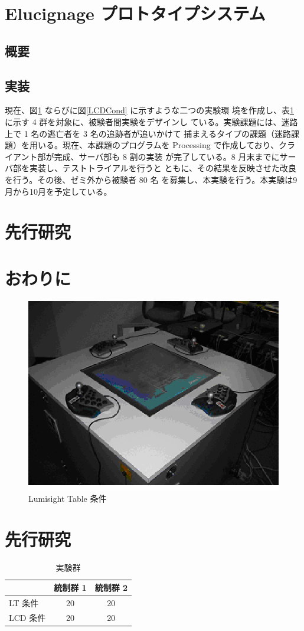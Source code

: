 \documentclass{matsushita-zemi}
\begin{document}
\section{Elucignage プロトタイプシステム}
\subsection{概要}

\subsection{実装}
現在、図\ref{LTCond} ならびに図\ref{LCDCond} に示すような二つの実験環
境を作成し、表\ref{exp} に示す 4 群を対象に、被験者間実験をデザインし
ている。実験課題には、迷路上で 1 名の逃亡者を 3 名の追跡者が追いかけて
捕まえるタイプの課題（迷路課題）を用いる。現在、本課題のプログラムを 
Processing で作成しており、クライアント部が完成、サーバ部も 8 割の実装
が完了している。8 月末までにサーバ部を実装し、テストトライアルを行うと
ともに、その結果を反映させた改良を行う。その後、ゼミ外から被験者 80 名
を募集し、本実験を行う。本実験は9月から10月を予定している。

\section{先行研究}
\label{relatedworks} 

\section{おわりに}

\begin{figure}[b]
 \centering
 \includegraphics[width=0.4\columnwidth]{LTCond.eps}
 \caption{Lumisight Table 条件}
 \label{LTCond}
\end{figure}

\section{先行研究}
\label{relatedworks} 

\begin{table}[p]
\caption{実験群}
\label{exp}
\begin{center}
\begin{tabular}{lcc}
\hline\hline
         & 統制群 1 & 統制群 2\\
\hline
LT 条件  & 20       &   20    \\
LCD 条件 & 20       &   20    \\ 
\hline
\end{tabular}
\end{center}
\end{table}



\end{document}
